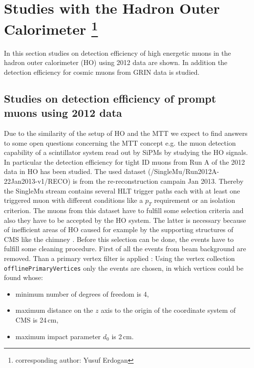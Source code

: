 \section[Studies with the Hadron Outer Calorimeter]{Studies with the Hadron Outer Calorimeter \footnote{corresponding author: Yusuf Erdogan}}
\label{sec:HOstudies}
	In this section studies on detection efficiency of high energetic muons in the hadron outer calorimeter (HO) using 2012 data are shown.
	In addition the detection efficiency for cosmic muons from GRIN data is studied.
	\subsection{Studies on detection efficiency of prompt muons using 2012 data}
		Due to the similarity of the setup of HO and the MTT we expect to find answers to some open questions concerning the MTT concept e.g. the muon detection capability of a
		scintillator system read out by SiPMs by studying the HO signals.
		In particular the detection efficiency for tight ID muons from Run A of the 2012 data in HO has been studied.
		The used dataset (/SingleMu/Run2012A-22Jan2013-v1/RECO) is from the re-reconstruction campain Jan 2013.
		Thereby the SingleMu stream contains several HLT trigger paths each with at least one triggered muon with different conditions like a $p_T$ requirement or an isolation criterion.
		The muons from this dataset have to fulfill some selection criteria and also they have to be accepted by the HO system.
		The latter is necessary because of inefficient areas of HO caused for example by the supporting structures of CMS like the chimney \cite{JINST}.
		Before this selection can be done, the events have to fulfill some cleaning procedure.
		First of all the events from beam background are removed.
		Than a primary vertex filter is applied \cite{CMS-PAPER-TRK-11-001}:
		Using the vertex collection \verb+offlinePrimaryVertices+ only the events are chosen, in which vertices could be found whose:
			\begin{itemize}
				\item minimum number of degrees of freedom is 4,
				\item maximum distance on the $z$ axis to the origin of the coordinate system of CMS is 24\,cm,
				\item maximum impact parameter $d_0$ is 2\,cm.
			\end{itemize}
